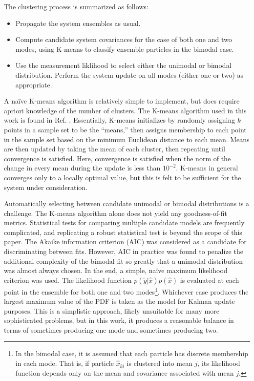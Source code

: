 \documentclass[]{article}
\begin{document}
The clustering process is summarized as follows:

\begin{itemize}
\item Propagate the system ensembles as usual.
\item Compute candidate system covariances for the case of both one and two modes, using K-means to classify ensemble particles in the bimodal case.
\item Use the measurement liklihood to select either the unimodal or bimodal distribution. Perform the system update on all modes (either one or two) as appropriate.
\end{itemize}

A na\"{i}ve K-means algorithm is relatively simple to implement, but does require apriori knowledge of the number of clusters. The K-means algorithm used in this work is found in Ref. \cite{mackay2003}. Essentially, K-means initializes by randomly assigning $k$ points in a sample set to be the ``means,'' then assigns membership to each point in the sample set based on the minimum Euclidean distance to each mean. Means are then updated by taking the mean of each cluster, then repeating until convergence is satisfied. Here, convergence is satisfied when the norm of the change in every mean during the update is less than $10^{-2}$. K-means in general converges only to a locally optimal value, but this is felt to be sufficient for the system under consideration.

Automatically selecting between candidate unimodal or bimodal distributions is a challenge. The K-means algorithm alone does not yield any goodness-of-fit metrics. Statistical tests for comparing multiple candidate models are frequently complicated, and replicating a robust statistical test is beyond the scope of this paper. The Akaike information criterion (AIC) was considered as a candidate for discriminating between fits. However, AIC in practice was found to penalize the additional complexity of the bimodal fit so greatly that a unimodal distribution was almost always chosen. In the end, a simple, na\"{i}ve maximum likelihood criterion was used. The likelihood function $p(\tilde{y} | \hat{x})p(\hat{x})$ is evaluated at each point in the ensemble for both one and two modes\footnote{In the bimodal case, it is assumed that each particle has discrete membership in each mode. That is, if particle $\hat{x}_{ki}$ is clustered into mean $j$, its likelihood function depends only on the mean and covariance associated with mean $j$.}. Whichever case produces the largest maximum value of the PDF is taken as the model for Kalman update purposes. This is a simplistic approach, likely unsuitable for many more sophisticated problems, but in this work, it produces a reasonable balance in terms of sometimes producing one mode and sometimes producing two.
\end{document}
